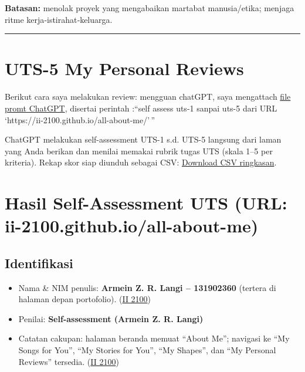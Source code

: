 \documentclass[
  letterpaper,
  DIV=11,
  numbers=noendperiod]{scrreprt}
\providecommand{\tightlist}{%
  \setlength{\itemsep}{0pt}\setlength{\parskip}{0pt}}
\begin{document}
\textbf{Batasan:} menolak proyek yang mengabaikan martabat
manusia/etika; menjaga ritme kerja‑istirahat‑keluarga.

\begin{center}\rule{0.5\linewidth}{0.5pt}\end{center}


\chapter{UTS-5 My Personal Reviews}\label{uts-5-my-personal-reviews}

Berikut cara saya melakukan review: mengguan chatGPT, saya mengattach
\href{skor_uts.pdf}{file promt ChatGPT}, disertai perintah :``self
assess uts-1 sanpai uts-5 dari URL
`https://ii-2100.github.io/all-about-me/'\,''

ChatGPT melakukan self-assessment UTS-1 s.d. UTS-5 langsung dari laman
yang Anda berikan dan menilai memakai rubrik tugas UTS (skala 1--5 per
kriteria). Rekap skor siap diunduh sebagai CSV:
\href{sandbox:/mnt/data/UTS_self_assessment.csv}{Download CSV
ringkasan}.


\chapter{Hasil Self-Assessment UTS (URL:
ii-2100.github.io/all-about-me)}\label{hasil-self-assessment-uts-url-ii-2100.github.ioall-about-me}

\section{Identifikasi}\label{identifikasi}

\begin{itemize}
\tightlist
\item
  Nama \& NIM penulis: \textbf{Armein Z. R. Langi -- 131902360} (tertera
  di halaman depan portofolio).
  (\href{https://ii-2100.github.io/all-about-me/}{II 2100})
\item
  Penilai: \textbf{Self-assessment (Armein Z. R. Langi)}
\item
  Catatan cakupan: halaman beranda memuat ``About Me''; navigasi ke ``My
  Songs for You'', ``My Stories for You'', ``My Shapes'', dan ``My
  Personal Reviews'' tersedia.
  (\href{https://ii-2100.github.io/all-about-me/}{II 2100})
\end{itemize}
\end{document}
